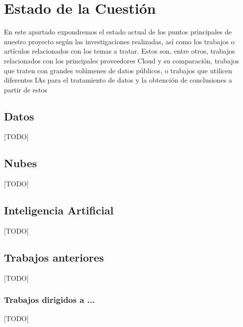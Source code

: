 \chapter{Estado de la Cuestión}
\label{cap:estadoDeLaCuestion}

En este apartado expondremos el estado actual de los puntos principales de nuestro proyecto según las investigaciones realizadas, así como los trabajos o artículos relacionados con los temas a tratar. Estos son, entre otros, trabajos relacionados con los principales proveedores Cloud y su comparación, trabajos que traten con grandes volúmenes de datos públicos, o trabajos que utilicen diferentes IAs para el tratamiento de datos y la obtención de conclusiones a partir de estos

\section{Datos}

[TODO]
	

\section{Nubes}

[TODO]


\section{Inteligencia Artificial}

[TODO]


\section{Trabajos anteriores}

[TODO]


\subsection{Trabajos dirigidos a ... }

   [TODO]

